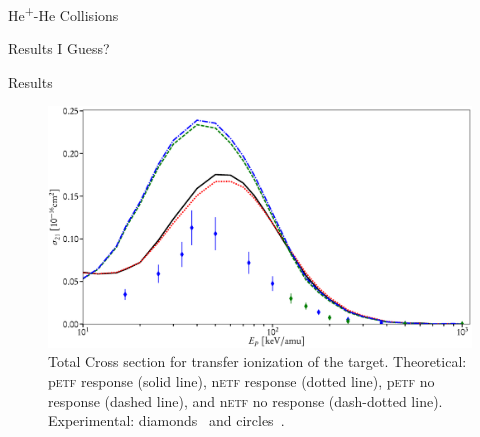 \documentclass[letterpaper, 11 pt]{report}
\begin{document}
\begin{chapter}{\texorpdfstring{He\textsuperscript{+}}{He+}-He Collisions \label{chap:hephe}}
\begin{section}{Results I Guess? \label{sec:hephe-disc}}
\begin{subsection}{Results \label{sec:hephe-res}}
         \begin{figure}[t]
            \centering
            \includegraphics[width = \linewidth]{./images/hephe-cross/HepHe-021.eps}
            \caption[Total Cross section for transfer ionization of the target in
                     He\textsuperscript{+}-He collisions.]
                     {Total Cross section for transfer ionization of the target.
                     Theoretical: p\textsc{etf} response (solid line), n\textsc{etf} response
                                  (dotted line),
                                  p\textsc{etf} no response (dashed line), and n\textsc{etf} no response
                                  (dash-dotted line).
                     Experimental: diamonds~\cite{Dub-89} and circles~\cite{FTFHLP-95}.
                     \label{fig:cs021}}
         \end{figure}


\end{subsection}
\end{section}
\end{chapter}
\end{document}
